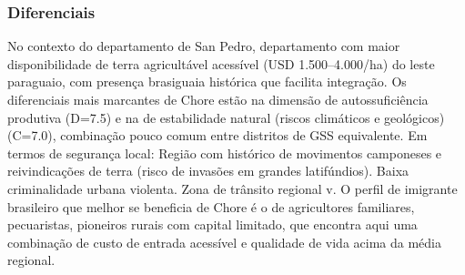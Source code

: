 \subsubsection*{Diferenciais}\label{dif-chore-0203}
No contexto do departamento de San Pedro, departamento com maior disponibilidade de terra agricultável acessível (USD 1.500–4.000/ha) do leste paraguaio, com presença brasiguaia histórica que facilita integração. Os diferenciais mais marcantes de Chore estão na dimensão de autossuficiência produtiva (D=7.5) e na de estabilidade natural (riscos climáticos e geológicos) (C=7.0), combinação pouco comum entre distritos de GSS equivalente. Em termos de segurança local: Região com histórico de movimentos camponeses e reivindicações de terra (risco de invasões em grandes latifúndios). Baixa criminalidade urbana violenta. Zona de trânsito regional v. O perfil de imigrante brasileiro que melhor se beneficia de Chore é o de agricultores familiares, pecuaristas, pioneiros rurais com capital limitado, que encontra aqui uma combinação de custo de entrada acessível e qualidade de vida acima da média regional.
